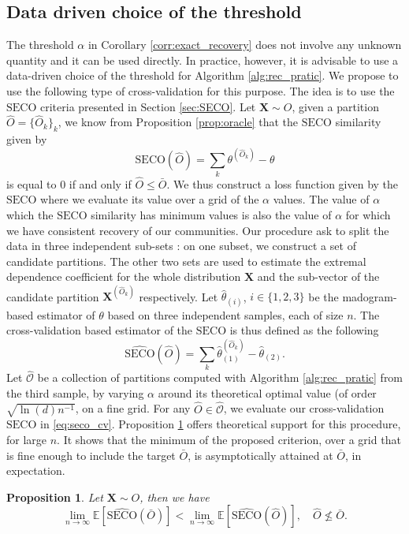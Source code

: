 \documentclass[11pt]{article}
\newcommand{\SECO}{\mathrm{SECO}}
\newtheorem{proposition}{Proposition}
\theoremstyle{definition}
\begin{document}
	\subsection{Data driven choice of the threshold}
	
	
	The threshold $\alpha$ in Corollary \ref{corr:exact_recovery} does not involve any unknown quantity and it can be used directly. In practice, however, it is advisable to use a data-driven choice of the threshold for Algorithm \ref{alg:rec_pratic}. We propose to use the following type of cross-validation for this purpose. The idea is to use the $\SECO$ criteria presented in Section \ref{sec:SECO}. Let $\textbf{X} \sim O$, given a partition $\hat{O} = \{ \hat{O}_k \}_k$, we know from Proposition \ref{prop:oracle} that the $\SECO$ similarity given by
	\begin{equation*}
		\SECO(\hat{O}) = \sum_{k} \theta^{(\hat{O}_k)} - \theta
	\end{equation*}
	is equal to $0$ if and only if $\hat{O} \leq \bar{O}$. We thus construct a loss function given by the $\SECO$ where we evaluate its value over a grid of the $\alpha$ values. The value of $\alpha$ which the $\SECO$ similarity has minimum values is also the value of $\alpha$ for which we have consistent recovery of our communities. Our procedure ask to split the data in three independent sub-sets : on one subset, we construct a set of candidate partitions. The other two sets are used to estimate the extremal dependence coefficient for the whole distribution $\textbf{X}$ and the sub-vector of the candidate partition $\textbf{X}^{(\hat{O}_k)}$ respectively. Let $\hat{\theta}_{(i)}$, $i \in \{1,2,3\}$ be the madogram-based estimator of $\theta$ based on three independent samples, each of size $n$. The cross-validation based estimator of the $\SECO$ is thus defined as the following
	\begin{equation}
		\label{eq:seco_cv}
		\widehat{\SECO}(\hat{O}) = \sum_{k} \hat{\theta}^{(\hat{O}_k)}_{(1)} - \hat{\theta}_{(2)}.
	\end{equation}
	Let $\widehat{\mathcal{O}}$ be a collection of partitions computed with Algorithm \ref{alg:rec_pratic} from the third sample, by varying $\alpha$ around its theoretical optimal value (of order $\sqrt{\ln(d) n^{-1}}$, on a fine grid. For any $\hat{O} \in \widehat{\mathcal{O}}$, we evaluate our cross-validation $\SECO$ in \eqref{eq:seco_cv}. Proposition \ref{prop:cv} offers theoretical support for this procedure, for large $n$. It shows that the minimum of the proposed criterion, over a grid that is fine enough to include the target $\bar{O}$, is asymptotically attained at $\bar{O}$, in expectation.
	\begin{proposition}
	\label{prop:cv}
		Let $\textbf{X} \sim O$, then we have
		\begin{equation*}
			\underset{n \rightarrow \infty}{\lim} \mathbb{E}\left[ \widehat{\SECO}(\bar{O}) \right] < \underset{n \rightarrow \infty}{\lim} \mathbb{E}\left[ \widehat{\SECO}(\hat{O})\right], \quad \hat{O} \not\leq \bar{O}.
		\end{equation*}
	\end{proposition}	
	
\end{document}
